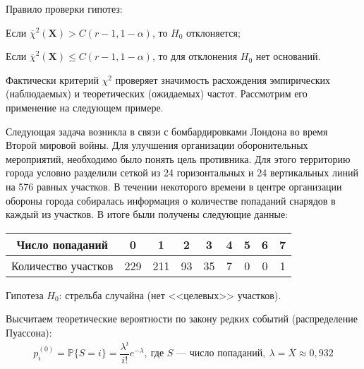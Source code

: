 Правило проверки гипотез:
\begin{compactlist}
    \item Если $\overline{\chi}^{2} \left(\mathbf{X}\right)>C(r-1,1-\alpha)$, то $H_0$ отклоняется;
    \item Если $\overline{\chi}^{2} \left(\mathbf{X}\right) \leqslant C(r-1,1-\alpha)$, то для отклонения $H_0$ нет оснований.
\end{compactlist}
\medskip
\begin{center}
\end{center}

Фактически критерий $\chi^{2}$ проверяет значимость расхождения эмпирических (наблюдаемых) и теоретических (ожидаемых) частот. Рассмотрим его применение на следующем примере.
\begin{exmp}
Следующая задача возникла в связи с бомбардировками Лондона во время Второй мировой войны. Для улучшения организации оборонительных мероприятий, необходимо было понять цель противника. Для этого территорию города условно разделили сеткой из 24 горизонтальных и 24 вертикальных линий на 576 равных участков. В течении некоторого времени в центре организации обороны города собиралась информация о количестве попаданий снарядов в каждый из участков. В итоге были получены следующие данные:
\begin{center}
    \begin{tabular}{|c|c|c|c|c|c|c|c|c|}
    \hline Число попаданий & 0 & 1 & 2 & 3 & 4 & 5 & 6 & 7 \\
    \hline Количество участков & 229 & 211 & 93 & 35 & 7 & 0 & 0 & 1 \\
    \hline
    \end{tabular}
\end{center}

Гипотеза $H_0$: стрельба случайна (нет <<целевых>> участков).

Высчитаем теоретические вероятности по закону редких событий (распределение Пуассона):
\begin{equation*}
    p_i^{(0)} = \mathbb{P}\{S=i\}=\frac{\lambda^{i}}{i !} e^{-\lambda}, ~\text{где $S$~--- число попаданий},~ \lambda = \overline{X} \approx 0,932
\end{equation*}
\end{exmp}

